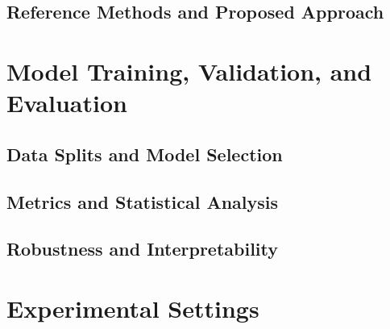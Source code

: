 \subsection{Reference Methods and Proposed Approach}

\section{Model Training, Validation, and Evaluation}
\subsection{Data Splits and Model Selection}
\subsection{Metrics and Statistical Analysis}
\subsection{Robustness and Interpretability}

\section{Experimental Settings}
